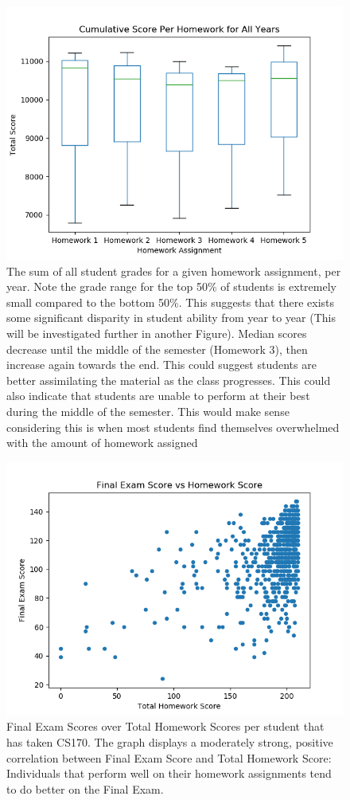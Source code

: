 \documentclass[12pt,letterpaper]{article}
\begin{document}
\begin{figure}[!htb]
  \includegraphics[width=\linewidth]{graph1.png}
  \caption{The sum of all student grades for a given homework assignment, per year. Note the grade range for the top 50\% of students is extremely small compared to the bottom 50\%. This suggests that there exists some significant disparity in student ability from year to year (This will be investigated further in another Figure). Median scores decrease until the middle of the semester (Homework 3), then increase again towards the end. This could suggest students are better assimilating the material as the class progresses. This could also indicate that students are unable to perform at their best during the middle of the semester. This would make sense considering this is when most students find themselves overwhelmed with the amount of homework assigned}
\end{figure}

\begin{figure}[!htb]
  \includegraphics[width=\linewidth]{graph2.png}
  \caption{Final Exam Scores over Total Homework Scores per student that has taken CS170. The graph displays a moderately strong, positive correlation between Final Exam Score and Total Homework Score: Individuals that perform well on their homework assignments tend to do better on the Final Exam.
  }
\end{figure}
\end{document}
